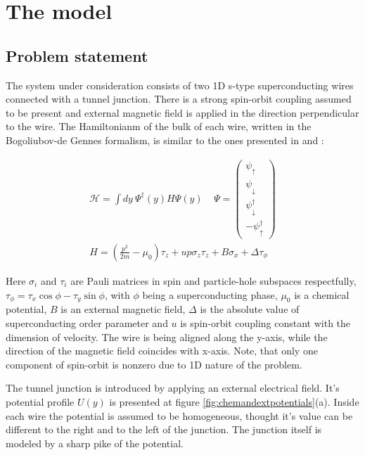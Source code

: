 \newcommand{\xbr}{\left(x\right)}
\newcommand{\br}[1]{\left(#1\right)}
\newcommand{\abs}[1]{\left|#1\right|}

\chapter{The model}

\section{Problem statement}

The system under consideration consists of two 1D s-type superconducting wires connected with a tunnel junction. There is a strong spin-orbit coupling assumed to be present and external magnetic field is applied in the direction perpendicular to the wire. The Hamiltonianm of the bulk of each wire, written in the Bogoliubov-de Gennes formalism, is similar to the ones presented in \cite{Oreg_2010} and \cite{Lutchyn_2010}:

\begin{gather}
	\mathcal{H}
	=
	\int dy ~
	\Psi^\dagger
	\br{y}
	H
	\Psi
	\br{y}
	\
	~~~~
	\Psi
	=
	\begin{pmatrix}
		\psi_\uparrow
		\\
		\psi_\downarrow
		\\
		\psi_\downarrow^\dagger
		\\
		-\psi_\uparrow^\dagger
	\end{pmatrix}
	\\
	\label{bulk_Hamiltonian}
	H
	=
	\br{
		\frac{p^2}{2m}
		-\mu_0
	}\tau_z
	+
	u p \sigma_z \tau_z
	+
	B\sigma_x	
	+
	\Delta\tau_\phi
\end{gather}

Here $ \sigma_i $ and $ \tau_i $ are Pauli matrices in spin and particle-hole subspaces respectfully, $ \tau_\phi = \tau_x \cos\phi - \tau_y \sin\phi$, with $ \phi $ being a superconducting phase, $ \mu_0 $ is a chemical potential, $ B $ is an external magnetic field, $ \Delta $ is the absolute value of superconducting order parameter and $ u $ is spin-orbit coupling constant with the dimension of velocity. The wire is being aligned along the y-axis, while the direction of the magnetic field coincides with x-axis. Note, that only one component of spin-orbit is nonzero due to 1D nature of the problem.

The tunnel junction is introduced  by applying an external electrical field. It's potential profile $U\br{y}  $ is presented at figure \ref{fig:chemandextpotentials}(a). Inside each wire the potential is assumed to be homogeneous, thought it's value can be different to the right and to the left of the junction. The junction itself is modeled by a sharp pike of the potential.
 
